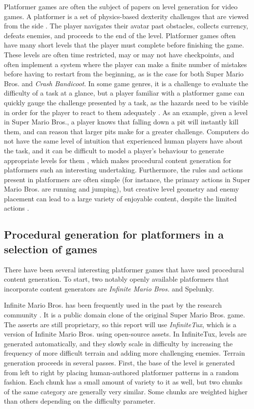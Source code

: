 Platformer games are often the subject of papers on level generation for video games. A
platformer is a set of physics-based dexterity challenges that are viewed from the side
\cite{shaker2011}. The player navigates their avatar past obstacles, collects currency,
defeats enemies, and proceeds to the end of the level. Platformer games often have many 
short levels that the player must complete before finishing the game. These levels are
often time restricted, may or may not have checkpoints, and often implement a system where
the player can make a finite number of mistakes before having to restart from the beginning,
as is the case for both Super Mario Bros. and \emph{Crash Bandicoot}. In some game genres,
it is a challenge to evaluate the difficulty of a task at a glance, but a player familiar
with a platformer game can quickly gauge the challenge presented by a task, as the hazards
need to be visible in order for the player to react to them adequately \cite{sorenson2010}.
As an example, given a level in Super Mario Bros., a player knows that falling down a pit 
will instantly kill them, and can reason that larger pits make for a greater challenge.
Computers do not have the same level of intuition that experienced human players have about
the task, and it can be difficult to model a player's behaviour to generate appropriate
levels for them \cite{shaker2011}, which makes procedural content generation for platformers
such an interesting undertaking. Furthermore, the rules and actions present in platformers
are often simple (for instance, the primary actions in Super Mario Bros. are running and
jumping), but creative level geometry and enemy placement can lead to a large variety of
enjoyable content, despite the limited actions \cite{dahlskog2012}.


\subsection{Procedural generation for platformers in a selection of games}

There have been several interesting platformer games that have used procedural content 
generation. To start, two notably openly available platformers that incorporate content
generators are \emph{Infinite Mario Bros.} and Spelunky.

Infinite Mario Bros. has been frequently used in the past by the research community
\cite{shaker2011}. It is a public domain clone of the original Super Mario Bros. game. The
asserts are still proprietary, so this report will use \emph{InfiniteTux}, which is a version
of Infinite Mario Bros. using open-source assets. In InfiniteTux, levels are generated
automatically, and they slowly scale in difficulty by increasing the frequency of more
difficult terrain and adding more challenging enemies. Terrain generation proceeds in
several passes. First, the base of the level is generated from left to right by placing
human-authored platformer patterns in a random fashion. Each chunk has a small amount of
variety to it as well, but two chunks of the same category are generally very similar.
Some chunks are weighted higher than others depending on the difficulty parameter.

